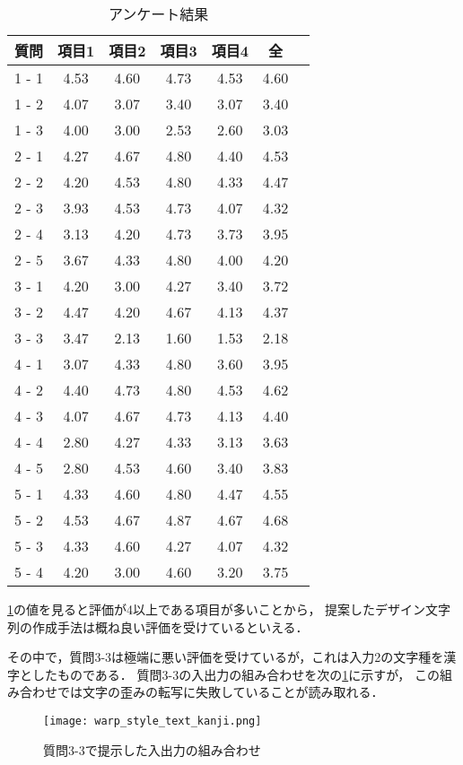 \documentclass[autodetect-engine,dvi=dvipdfmx,ja=standard,a4j,jbase=10.5pt,twoside,twocolumn,magstyle=nomag*]{bxjsarticle}
\begin{document}
\begin{table}[h]
    \centering
    \caption{アンケート結果}
    \begin{tabular}[t]{ccccccc}
        \toprule
        質問    & 項目1  & 項目2  & 項目3  & 項目4  & 全    \\
        \midrule
        1 - 1 & 4.53 & 4.60 & 4.73 & 4.53 & 4.60 \\
        1 - 2 & 4.07 & 3.07 & 3.40 & 3.07 & 3.40 \\
        1 - 3 & 4.00 & 3.00 & 2.53 & 2.60 & 3.03 \\
        \hline
        2 - 1 & 4.27 & 4.67 & 4.80 & 4.40 & 4.53 \\
        2 - 2 & 4.20 & 4.53 & 4.80 & 4.33 & 4.47 \\
        2 - 3 & 3.93 & 4.53 & 4.73 & 4.07 & 4.32 \\
        2 - 4 & 3.13 & 4.20 & 4.73 & 3.73 & 3.95 \\
        2 - 5 & 3.67 & 4.33 & 4.80 & 4.00 & 4.20 \\
        \hline
        3 - 1 & 4.20 & 3.00 & 4.27 & 3.40 & 3.72 \\
        3 - 2 & 4.47 & 4.20 & 4.67 & 4.13 & 4.37 \\
        3 - 3 & 3.47 & 2.13 & 1.60 & 1.53 & 2.18 \\
        \hline
        4 - 1 & 3.07 & 4.33 & 4.80 & 3.60 & 3.95 \\
        4 - 2 & 4.40 & 4.73 & 4.80 & 4.53 & 4.62 \\
        4 - 3 & 4.07 & 4.67 & 4.73 & 4.13 & 4.40 \\
        4 - 4 & 2.80 & 4.27 & 4.33 & 3.13 & 3.63 \\
        4 - 5 & 2.80 & 4.53 & 4.60 & 3.40 & 3.83 \\
        \hline
        5 - 1 & 4.33 & 4.60 & 4.80 & 4.47 & 4.55 \\
        5 - 2 & 4.53 & 4.67 & 4.87 & 4.67 & 4.68 \\
        5 - 3 & 4.33 & 4.60 & 4.27 & 4.07 & 4.32 \\
        5 - 4 & 4.20 & 3.00 & 4.60 & 3.20 & 3.75 \\
        \bottomrule
    \end{tabular}
    \label{tab:questionnaire}
\end{table}

\cref{tab:questionnaire}の値を見ると評価が4以上である項目が多いことから，
提案したデザイン文字列の作成手法は概ね良い評価を受けているといえる．

その中で，質問3-3は極端に悪い評価を受けているが，これは入力2の文字種を漢字としたものである．
質問3-3の入出力の組み合わせを次の\cref{fig:warp_style_text_kanji}に示すが，
この組み合わせでは文字の歪みの転写に失敗していることが読み取れる．
\begin{figure}[h]
    \centering
    \texttt{[image: warp\_style\_text\_kanji.png]}
    \caption{質問3-3で提示した入出力の組み合わせ}
    \label{fig:warp_style_text_kanji}
\end{figure}
\end{document}
